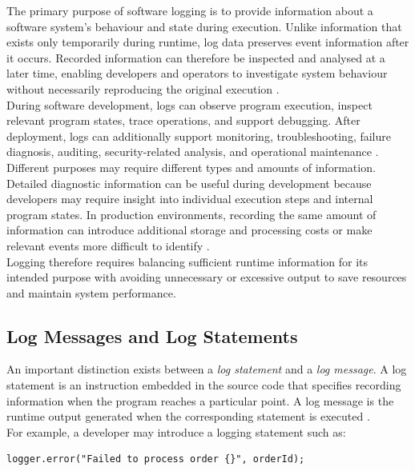 The primary purpose of software logging is to provide information about a software system's behaviour and state during execution. 
Unlike information that exists only temporarily during runtime, log data preserves event information after it occurs.
Recorded information can therefore be inspected and analysed at a later time, enabling developers and operators to investigate system
behaviour without necessarily reproducing the original execution 
\cite{chen2021asurveyofsoftwareloginstrumentation}.
\\
During software development, logs can observe program execution, inspect relevant program states, trace operations, and support debugging. 
After deployment, logs can additionally support monitoring, troubleshooting, failure diagnosis, auditing, security-related analysis, 
and operational maintenance \cite{chen2021asurveyofsoftwareloginstrumentation,gu2023loggingpracticesinsoftwareengineering}.
\\
Different purposes may require different types and amounts of information. 
Detailed diagnostic information can be useful during development because developers may require insight into individual execution steps
and internal program states. In production environments, recording the same amount of information can introduce additional storage
and processing costs or make relevant events more difficult to identify \cite{gholamian2021whatdistributedsystemssay}.
\\
Logging therefore requires balancing sufficient runtime information for its intended purpose with avoiding unnecessary or excessive output 
to save resources and maintain system performance.

\subsection{Log Messages and Log Statements} \label{subsec:log_messages_statements}
An important distinction exists between a \textit{log statement} and a \textit{log message}.
A log statement is an instruction embedded in the source code that specifies recording information when the program reaches a particular point.
A log message is the runtime output generated when the corresponding statement is executed \cite{chen2021asurveyofsoftwareloginstrumentation,yuan2012characterzingloggingpractices}.
\\
For example, a developer may introduce a logging statement such as:

\begin{verbatim}
logger.error("Failed to process order {}", orderId);
\end{verbatim}

